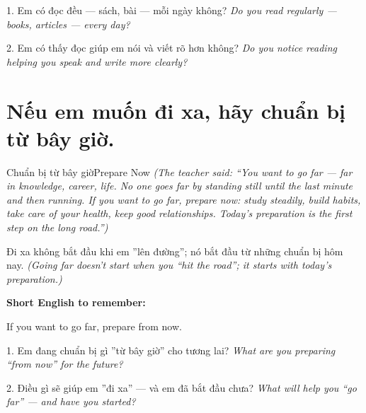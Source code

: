 \begin{tuhocnhanh}
1. Em có đọc đều — sách, bài — mỗi ngày không? \textit{Do you read regularly — books, articles — every day?}

2. Em có thấy đọc giúp em nói và viết rõ hơn không? \textit{Do you notice reading helping you speak and write more clearly?}
\end{tuhocnhanh}
\ngancach

\section{Nếu em muốn đi xa, hãy chuẩn bị từ bây giờ.}
\begin{truyen}{Chuẩn bị từ bây giờ}{Prepare Now}
\textit{(The teacher said: ``You want to go far — far in knowledge, career, life. No one goes far by standing still until the last minute and then running. If you want to go far, prepare now: study steadily, build habits, take care of your health, keep good relationships. Today's preparation is the first step on the long road.'')}
\end{truyen}

\begin{baihoc}
Đi xa không bắt đầu khi em ''lên đường''; nó bắt đầu từ những chuẩn bị hôm nay.
\textit{(Going far doesn't start when you ``hit the road''; it starts with today's preparation.)}
\end{baihoc}

\begin{ghinhoanh}
\textbf{Short English to remember:}

If you want to go far, prepare from now.

\end{ghinhoanh}

\begin{tuhocnhanh}
1. Em đang chuẩn bị gì ''từ bây giờ'' cho tương lai? \textit{What are you preparing ``from now'' for the future?}

2. Điều gì sẽ giúp em ''đi xa'' — và em đã bắt đầu chưa? \textit{What will help you ``go far'' — and have you started?}
\end{tuhocnhanh}
\ngancach

